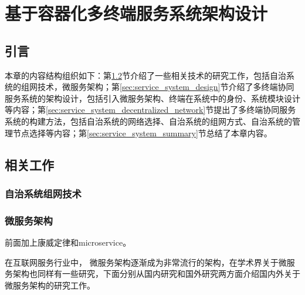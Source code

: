 \chapter{基于容器化多终端服务系统架构设计 }\label{chap:service_system}

\section{引言}

本章的内容结构组织如下：第\ref{sec:service_system_related_work}节介绍了一些相关技术的研究工作，包括自治系统的组网技术，微服务架构；第\ref{sec:service_system_design}节介绍了多终端协同服务系统的架构设计，包括引入微服务架构、终端在系统中的身份、系统模块设计等内容；第\ref{sec:service_system_decentralized_network}节提出了多终端协同服务系统的构建方法，包括自治系统的网络选择、自治系统的组网方式、自治系统的管理节点选择等内容；第\ref{sec:service_system_summary}节总结了本章内容。
\section{相关工作}\label{sec:service_system_related_work}
\subsection{自治系统组网技术}



\subsection{微服务架构}
前面加上康威定律和microservice。

在互联网服务行业中，  微服务架构逐渐成为非常流行的架构，在学术界关于微服务架构也同样有一些研究，下面分别从国内研究和国外研究两方面介绍国内外关于微服务架构的研究工作。

